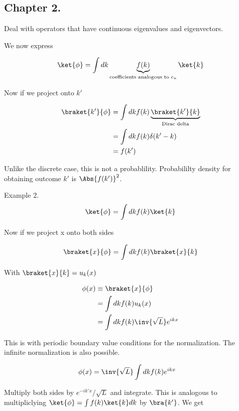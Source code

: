 \subsection{Chapter 2.}

Deal with operators that have continuous eigenvalues and eigenvectors.

We now express 

\begin{align*}
\ket{\phi} = \int dk \underbrace{f(k)}_{\text{coefficients analogous to $c_n$}} \ket{k}
\end{align*}

Now if we project onto $k'$

\begin{align*}
\braket{k'}{\phi} 
&= \int dk f(k) \underbrace{\braket{k'}{k}}_{\text{Dirac delta}} \\
&= \int dk f(k) \delta(k' -k) \\
&= f(k') 
\end{align*}

Unlike the discrete case, this is not a probablility.  Probabililty density for obtaining outcome $k'$ is $\Abs{f(k')}^2$.

Example 2.
\begin{align*}
\ket{\phi} = \int dk f(k) \ket{k}
\end{align*}

Now if we project x onto both sides

\begin{align*}
\braket{x}{\phi} 
&= \int dk f(k) \braket{x}{k} \\
\end{align*}

With $\braket{x}{k} = u_k(x)$

\begin{align*}
\phi(x) 
&\equiv \braket{x}{\phi} \\
&= \int dk f(k) u_k(x)  \\
&= \int dk f(k) \inv{\sqrt{L}} e^{ikx}
\end{align*}

This is with periodic boundary value conditions for the normalization.  The infinite normalization is also possible.

\begin{align*}
\phi(x) 
&= \inv{\sqrt{L}} \int dk f(k) e^{ikx}
\end{align*}

Multiply both sides by $e^{-ik'x}/\sqrt{L}$ and integrate.  This is analogous to multipliclying $\ket{\phi} = \int f(k) \ket{k} dk$ by $\bra{k'}$.  We get

